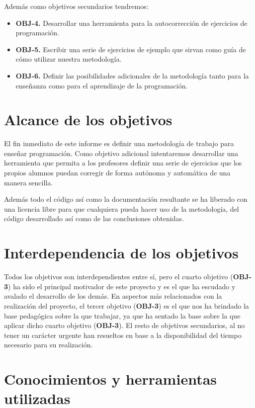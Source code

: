 Además como objetivos secundarios tendremos:

\begin{itemize}
  \item \textbf{OBJ-4.} Desarrollar una herramienta para la autocorrección de ejercicios de programación.
  \item \textbf{OBJ-5.} Escribir una serie de ejercicios de ejemplo que sirvan como guía de cómo utilizar nuestra metodología.
  \item \textbf{OBJ-6.} Definir las posibilidades adicionales de la metodología tanto para la enseñanza como para el aprendizaje de la programación.
\end{itemize}

\section{Alcance de los objetivos}
El fin inmediato de este informe es definir una metodología de trabajo para enseñar programación. Como objetivo adicional intentaremos desarrollar una herramienta que permita a los profesores definir una serie de ejercicios que los propios alumnos puedan corregir de forma autónoma y automática de una manera sencilla.

\bigskip
Además todo el código así como la documentación resultante se ha liberado con una licencia libre para que cualquiera pueda hacer uso de la metodología, del código desarrollado así como de las conclusiones obtenidas.

\section{Interdependencia de los objetivos}

Todos los objetivos son interdependientes entre sí, pero el cuarto objetivo (\textbf{OBJ-3}) ha sido el principal motivador de este proyecto y es el que ha escudado y avalado el desarrollo de los demás. En aspectos más relacionados con la realización del proyecto, el tercer objetivo (\textbf{OBJ-3}) es el que nos ha brindado la base pedagógica sobre la que trabajar, ya que ha sentado la base sobre la que aplicar dicho cuarto objetivo (\textbf{OBJ-3}). El resto de objetivos secundarios, al no tener un carácter urgente han resueltos en base a la disponibilidad del tiempo necesario para su realización.

\section{Conocimientos y herramientas utilizadas}

